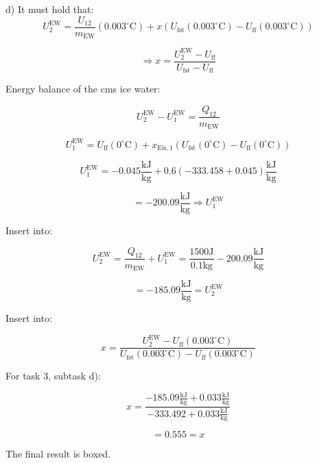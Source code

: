 d) It must hold that:
\[ U_2^{\text{EW}} = \frac{U_{12}}{m_{\text{EW}}}(0.003^\circ \text{C}) + x \left( U_{\text{fst}}(0.003^\circ \text{C}) - U_{\text{ff}}(0.003^\circ \text{C}) \right) \]

\[ \Rightarrow x = \frac{U_2^{\text{EW}} - U_{\text{ff}}}{U_{\text{fst}} - U_{\text{ff}}} \]

Energy balance of the cms ice water:

\[ U_2^{\text{EW}} - U_1^{\text{EW}} = \frac{Q_{12}}{m_{\text{EW}}} \]

\[ U_1^{\text{EW}} = U_{\text{ff}}(0^\circ \text{C}) + x_{\text{Eis},1} \left( U_{\text{fst}}(0^\circ \text{C}) - U_{\text{ff}}(0^\circ \text{C}) \right) \]

\[ U_1^{\text{EW}} = -0.045 \frac{\text{kJ}}{\text{kg}} + 0.6 \left( -333.458 + 0.045 \right) \frac{\text{kJ}}{\text{kg}} \]

\[ = -200.09 \frac{\text{kJ}}{\text{kg}} \Rightarrow U_1^{\text{EW}} \]

Insert into:

\[ U_2^{\text{EW}} = \frac{Q_{12}}{m_{\text{EW}}} + U_1^{\text{EW}} = \frac{1500 \text{J}}{0.1 \text{kg}} - 200.09 \frac{\text{kJ}}{\text{kg}} \]

\[ = -185.09 \frac{\text{kJ}}{\text{kg}} = U_2^{\text{EW}} \]

Insert into:

\[ x = \frac{U_2^{\text{EW}} - U_{\text{ff}}(0.003^\circ \text{C})}{U_{\text{fst}}(0.003^\circ \text{C}) - U_{\text{ff}}(0.003^\circ \text{C})} \]

For task 3, subtask d):

\[ x = \frac{-185.09 \frac{\text{kJ}}{\text{kg}} + 0.033 \frac{\text{kJ}}{\text{kg}}}{-333.492 + 0.033 \frac{\text{kJ}}{\text{kg}}} \]

\[ = 0.555 = x \]

The final result is boxed.
